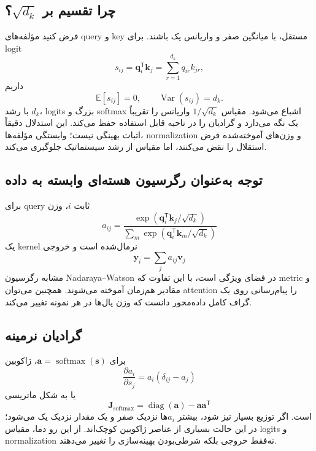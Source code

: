 \documentclass[12pt,openany,oneside]{book}
\newcommand{\E}{\mathbb{E}}
\newcommand{\Var}{\operatorname{Var}}
\newcommand{\trans}{^{\mathsf T}}
\newcommand{\vect}[1]{\bm{#1}}
\newcommand{\mat}[1]{\bm{#1}}
\newcommand{\diag}{\operatorname{diag}}
\newcommand{\softmax}{\operatorname{softmax}}
\begin{document}
\subsection{چرا تقسیم بر $\sqrt{d_k}$؟}
فرض کنید مؤلفه‌های query و key مستقل، با میانگین صفر و واریانس یک باشند. برای logit
\begin{equation}
s_{ij}=\vect q_i\trans\vect k_j=\sum_{r=1}^{d_k}q_{ir}k_{jr},
\end{equation}
داریم
\begin{equation}
\E[s_{ij}]=0,
\qquad
\Var(s_{ij})=d_k.
\end{equation}
با رشد $d_k$، logits بزرگ و softmax اشباع می‌شود. مقیاس $1/\sqrt{d_k}$ واریانس را تقریباً یک نگه می‌دارد و گرادیان را در ناحیه قابل استفاده حفظ می‌کند.
این استدلال دقیقاً اثبات بهینگی نیست؛ وابستگی مؤلفه‌ها، normalization و وزن‌های آموخته‌شده فرض استقلال را نقض می‌کنند، اما مقیاس از رشد سیستماتیک جلوگیری می‌کند.

\subsection{توجه به‌عنوان رگرسیون هسته‌ای وابسته به داده}
برای query ثابت $i$، وزن
\begin{equation}
a_{ij}=\frac{\exp(\vect q_i\trans\vect k_j/\sqrt{d_k})}
{\sum_m\exp(\vect q_i\trans\vect k_m/\sqrt{d_k})}
\end{equation}
یک kernel نرمال‌شده است و خروجی
\begin{equation}
\vect y_i=\sum_j a_{ij}\vect v_j
\end{equation}
مشابه رگرسیون Nadaraya--Watson در فضای ویژگی است، با این تفاوت که metric و مقادیر هم‌زمان آموخته می‌شوند. همچنین می‌توان attention را پیام‌رسانی روی یک گراف کامل داده‌محور دانست که وزن یال‌ها در هر نمونه تغییر می‌کند.

\subsection{گرادیان نرمینه}
برای $\vect a=\softmax(\vect s)$، ژاکوبین
\begin{equation}
\frac{\partial a_i}{\partial s_j}
=a_i(\delta_{ij}-a_j)
\end{equation}
یا به شکل ماتریسی
\begin{equation}
\mat J_{\mathrm{softmax}}=\diag(\vect a)-\vect a\vect a\trans
\end{equation}
است. اگر توزیع بسیار تیز شود، بیشتر $a_i$ها نزدیک صفر و یک مقدار نزدیک یک می‌شود؛ در این حالت بسیاری از عناصر ژاکوبین کوچک‌اند. از این رو دما، مقیاس logits و normalization نه‌فقط خروجی بلکه شرطی‌بودن بهینه‌سازی را تغییر می‌دهند.
\end{document}
